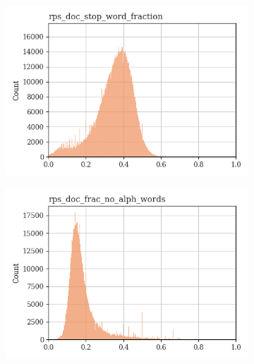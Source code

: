 \documentclass{article}
\begin{document}
\begin{figure}
\begin{subfigure}[b]{0.32\textwidth}
     \end{subfigure}
     \hfill
     \begin{subfigure}[b]{0.32\textwidth}
         \centering
         \includegraphics[width=\textwidth]{figures/quality_signals/rps_doc_stop_word_fraction.png}
     \end{subfigure}
    \begin{subfigure}[b]{0.32\textwidth}
        \centering
        \includegraphics[width=\textwidth]{figures/quality_signals/rps_doc_frac_no_alph_words.png}
    \end{subfigure}
    \hfill
    \begin{subfigure}[b]{0.32\textwidth}
        \centering

\end{subfigure}
\end{figure}
\end{document}
